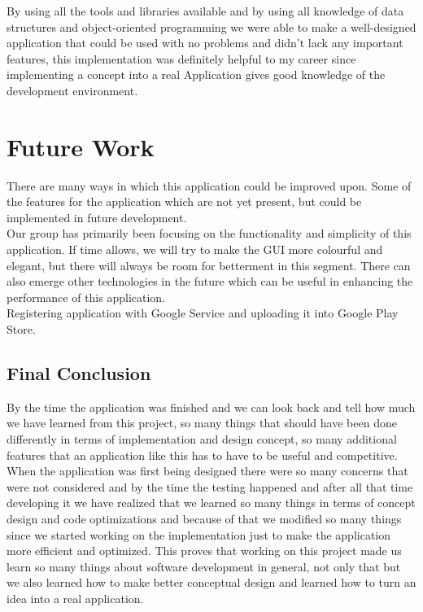 By using all the tools and libraries available and by using all knowledge of data structures and object-oriented programming we were able to make a well-designed application that could be used with no problems and didn’t lack any important features, this implementation was definitely helpful to my career since implementing a concept into a real Application gives good knowledge of the development environment.

\section{Future Work}
There are many ways in which this application could be improved upon. Some of the features for the application which are not yet present, but could be implemented in future development.\\

Our group has primarily been focusing on the functionality and simplicity of this application. If time allows, we will try to make the GUI more colourful and elegant, but there will always be room for betterment in this segment. There can also emerge other technologies in the future which can be useful in enhancing the performance of this application.\\

Registering application with Google Service and uploading it into Google Play Store.  

\begin{center}
    \section*{\huge{Final Conclusion}}
\end{center}

By the time the application was finished and we can look back and tell how much we have learned from this project, so many things that should have been done differently in terms of implementation and design concept, so many additional features that an application like this has to have to be useful and competitive. \\

When the application was first being designed there were so many concerns that were not considered and by the time the testing happened and after all that time developing it we have realized that we learned so many things in terms of concept design and code optimizations and because of that we modified so many things since we started working on the implementation just to make the application more efficient and optimized. This proves that working on this project made us learn so many things about software development in general, not only that but we also learned how to make better conceptual design and learned how to turn an idea into a real application.\\

